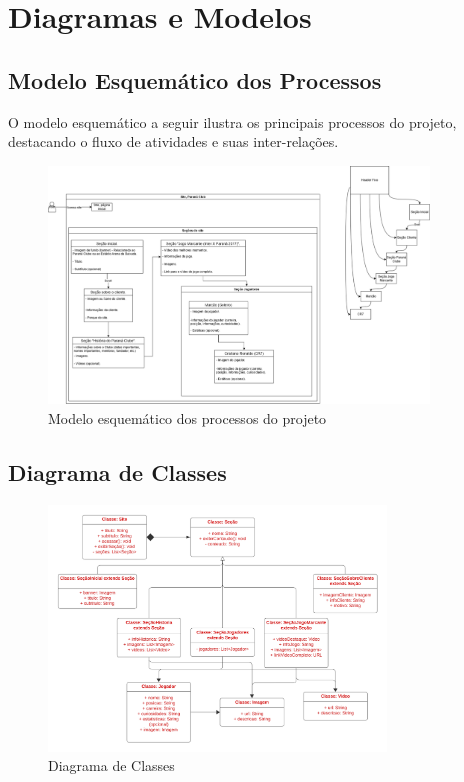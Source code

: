\documentclass[12pt,a4paper]{article}
\begin{document}
\section{Diagramas e Modelos}
\subsection{Modelo Esquemático dos Processos}
O modelo esquemático a seguir ilustra os principais processos do projeto, destacando o fluxo de atividades e suas inter-relações.

\begin{figure}[h!]
    \centering
    \includegraphics[width=0.9\textwidth]{modelo.png}
    \caption{Modelo esquemático dos processos do projeto}
\end{figure}

\subsection{Diagrama de Classes}
\begin{figure}[H]
   \centering
   \includegraphics[width=0.8\textwidth]{Classes.jpg}
   \caption{Diagrama de Classes}
\end{figure}
\end{document}
